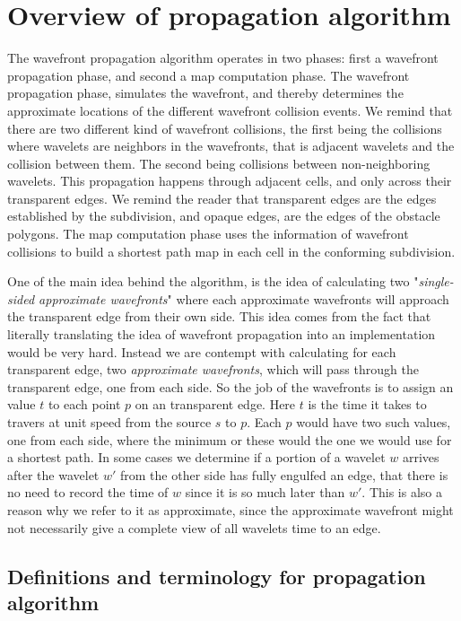 \section{Overview of propagation algorithm}

The wavefront propagation algorithm operates in two phases: first a wavefront 
propagation phase, and second a map computation phase. The wavefront propagation 
phase, simulates the wavefront, and thereby determines the approximate locations of 
the different wavefront collision events. We remind that there are two different kind 
of wavefront collisions, the first being the collisions where wavelets are neighbors 
in the wavefronts, that is adjacent wavelets and the collision between them. 
The second being collisions between non-neighboring wavelets. This propagation happens 
through adjacent cells, and only across 
their transparent edges. We remind the reader that transparent edges are the edges 
established by the subdivision, and opaque edges, are the edges of the obstacle 
polygons. The map computation phase uses the information of wavefront collisions to 
build a shortest path map in each cell in the conforming subdivision. 

One of the main idea behind the algorithm, is the idea of calculating two 
"\textit{single-sided approximate wavefronts}" where each approximate wavefronts 
will approach the transparent edge from their own side. This 
idea comes from the fact that literally translating the idea of wavefront propagation  
into an implementation would be very hard. Instead we are contempt with calculating 
for each transparent edge, two \textit{approximate wavefronts}, which will pass 
through the transparent edge, one from each side. So the job of the wavefronts is to 
assign an value $t$ to each point $p$ on an transparent edge. Here $t$ is the time it 
takes to travers at unit speed from the source $s$ to $p$. Each $p$ would have two 
such values, one from each side, where the minimum or these would the one we would use 
for a shortest path. In some cases we determine if a portion of a wavelet $w$ arrives 
after the wavelet $w'$ from the other side has fully engulfed an edge, that there is 
no need to record the time of $w$ since it is so much later than $w'$. This is also a 
reason why we refer to it as approximate, since the approximate wavefront might not 
necessarily give a complete view of all wavelets time to an edge.

\subsection{Definitions and terminology for propagation algorithm}

